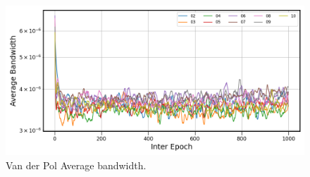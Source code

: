 
\begin{figure}[ht]
    \centering
    \begin{minipage}{\textwidth}
        \includegraphics[width=\textwidth]{"../Figures/van_der_pol_bandwidth_averages_plot.png"} 
    \end{minipage} 
    \caption{Van der Pol Average bandwidth.}
    \label{fig:van der pol average bandwidth}
\end{figure}

